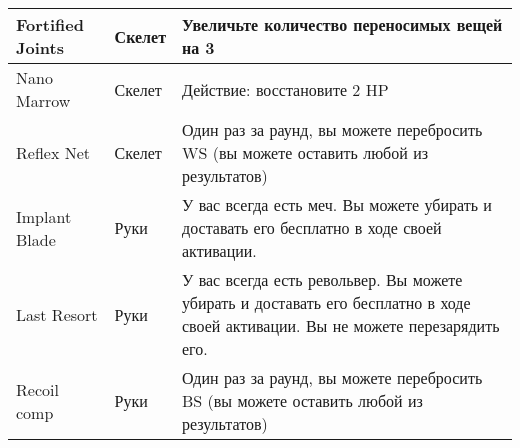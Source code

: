 \begin{table}[h]
\begin{tabularx}{\textwidth}{|l|l|X|}
    Fortified Joints   & Скелет     & Увеличьте количество переносимых вещей на 3                                                                                                      \\ \hline
    Nano Marrow        & Скелет     & Действие: восстановите 2 HP                                                                                                                      \\ \hline
    Reflex Net         & Скелет     & Один раз за раунд, вы можете перебросить WS (вы можете оставить любой из результатов)                                                            \\ \hline
    Implant Blade      & Руки       & У вас всегда есть меч. Вы можете убирать и доставать его бесплатно в ходе своей активации.                                                       \\ \hline
    Last Resort        & Руки       & У вас всегда есть револьвер. Вы можете убирать и доставать его бесплатно в ходе своей активации. Вы не можете перезарядить его.                  \\ \hline
    Recoil comp        & Руки       & Один раз за раунд, вы можете перебросить BS (вы можете оставить любой из результатов)                                                            \\ \hline
    \end{tabularx}
    \end{table}
